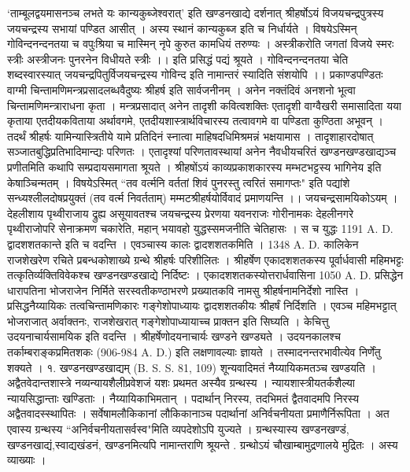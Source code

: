 `ताम्बूलद्वयमासनञ्च लभते यः कान्यकुब्जेश्वरात्' इति खण्डनखाद्ये दर्शनात् श्रीहर्षोऽयं विजयचन्द्रपुत्रस्य जयचन्द्रस्य सभायां पण्डित आसीत् । अस्य स्थानं कान्यकुब्ज इति च निर्धार्यते । विषयेऽस्मिन् 
गोविन्दनन्दनतया च वपुःश्रिया च
मास्मिन् नृपे कुरुत कामधियं तरुण्यः ।
अस्त्रीकरोति जगतां विजये स्मरः
स्त्रीः अस्त्रीजनः पुनरनेन विधीयते स्त्रीः ।।
इति प्रसिद्धं पद्यं श्रूयते । गोविन्दनन्दनतया चेति शब्दस्वारस्यात् जयचन्द्रपितुर्विजयचन्द्रस्य गोविन्द इति नामान्तरं स्यादिति संशयोपि ।।
प्रकाण्डपण्डितः वाग्मी चिन्तामणिमन्त्रप्रसादलब्धवैदुष्यः श्रीहर्ष इति सार्वजनीनम् । अनेन नक्तंदिवं अनशनो भूत्वा चिन्तामणिमन्त्राराधना कृता । मन्त्रप्रसादात् अनेन तादृशी कवित्वशक्तिः एतादृशी वाग्वैखरी समासादिता यया कृताया एतदीयकविताया अर्थावगमे, एतदीयशास्त्रार्थविचारस्य तत्वावगमे वा पण्डिता कुण्ठिता अभूवन् । तदर्थं श्रीहर्षः यामिन्यास्त्रितीये यामे प्रतिदिनं स्नात्वा माहिषदधिमिश्रमन्नं भक्षयामास । तादृशाहारदोषात् सञ्जातबुद्धिप्रतिभादिमान्द्यः परिणतः । एतादृश्यां परिणतावस्थायां अनेन नैवधीयचरितं खण्डनखण्डखाद्यञ्च प्रणीतमिति कथापि सम्प्रदायसमागता श्रूयते ।
श्रीहषोंऽयं काव्यप्रकाशकारस्य मम्भटभट्टस्य भागिनेय इति केषाञ्चिन्मतम् । विषयेऽस्मित् ``तव वर्त्मनि वर्ततां शिवं पुनरस्तु त्वरितं समागप्तः" इति पद्यांशे सन्ध्यश्लीलदोषप्रयुक्तं (तव वर्त्म निवर्तताम्) मम्मटश्रीहर्षयोर्विवादं प्रमाणयन्ति ।।
जयचन्द्रसामयिकोऽयम् । देहलीशाय पृथ्वीराजाय द्रुह्य असूयावतश्च जयचन्द्रस्य प्रेरणया यवनराजः गोरीनामकः देहलीनगरे पृथ्वीराजोपरि सेनाक्रमण चकारेति, महान् भयावहो युद्धस्समजनीति चेतिहासः । स च युद्धः 1191 A. D. द्वादशशतकान्ते इति च वदन्ति । एवञ्चास्य कालः द्वादशशतकमिति ।
1348 A. D. कालिकेन राजशेखरेण रचिते प्रबन्धकोशाख्ये ग्रन्थे श्रीहर्षः परिशीलितः । श्रीहर्षेण एकादशशतकस्य पूर्वार्धवासी महिमभट्टः तत्कृतिर्व्यक्तिविवेकश्च खण्डनखण्डखाद्ये निर्दिष्टः । एकादशशतकस्योत्तरार्धवासिना 1050 A. D. प्रसिद्धेन धारापतिना भोजराजेन निर्मिते सरस्वतीकण्ठाभरणे प्रख्यातकवि नामसु श्रीहर्षनामनिर्देशो नास्ति । प्रसिद्धनैय्यायिकः तत्वचिन्तामणिकारः गङ्गेशोपाध्यायः द्वादशशतकीयः श्रीहर्षं निर्दिशति । एवञ्च महिमभट्टात् भोजराजात् अर्वाक्तनः, राजशेखरात् गङ्गेशोपाध्यायाच्च प्राक्तन इति सिघ्यति ।
केचित्तु उदयनाचार्यसामयिक इति वदन्ति । श्रीहर्षेणोदयनाचार्यः खण्डने खण्ड्यते । उदयनकालश्च तर्काम्बराङ्कप्रमितशकः (906-984 A. D.) इति लक्षणावल्याः ज्ञायते । तस्मादनन्तरभावीत्येव निर्णेंतु शक्यते ।
१. खण्डनखण्डखाद्यम् (B. S. S. 81, 109)
शून्यवादिमतं नैय्यायिकमतञ्च खण्डयति । अद्वैतवेदान्तशास्त्रे नव्यन्यायशैलीप्रवेशजं यशः प्रथमत अस्यैव ग्रन्थस्य । न्यायशास्त्रीयतर्कशैल्या न्यायसिद्धान्ताः खण्डिताः । नैय्यायिकाभिमतान् । पदार्थान् निरस्य, तदभिमतं द्वैतवादमपि निरस्य अद्वैतवादस्स्थापितः । सर्वेषामलौकिकानां लौकिकानाञ्च पदार्थानां अनिर्वचनीयता प्रमाणैर्निरूपिता । अत एवास्य ग्रन्थस्य ``अनिर्वचनीयतासर्वस्व"मिति व्यपदेशोऽपि युज्यते । ग्रन्थस्यास्य खण्डनखण्डं, खण्डनखाद्यं,स्वाद्यखंडनं, खण्डनमित्यपि नामान्तराणि श्रूयन्ते . ग्रन्थोऽयं चौखाम्बामुद्रणालये मुद्रितः । अस्य व्याख्याः ।
